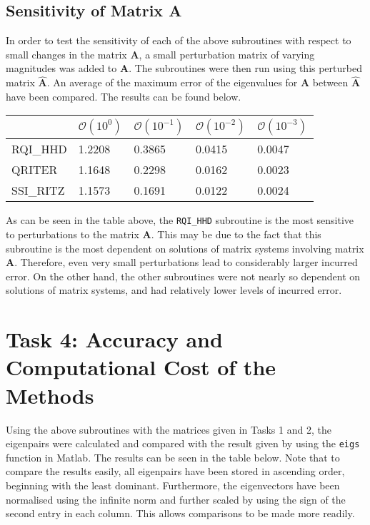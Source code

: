 \documentclass[11pt,oneside]{article}
\begin{document}
\subsection*{Sensitivity of Matrix A}

In order to test the sensitivity of each of the above subroutines with respect to small changes in the matrix \textbf{A}, a small perturbation matrix of varying magnitudes was added to \textbf{A}. The subroutines were then run using this perturbed matrix $\mathbf{\hat{A}}$. An average of the maximum error of the eigenvalues for \textbf{A} between $\mathbf{\hat{A}}$ have been compared. The results can be found below.

\begin{center}
	\begin{tabular}{| l | l | l | l | l |}
	\hline
	& $\mathcal{O}(10^0)$ & $\mathcal{O}(10^{-1})$ & $\mathcal{O}(10^{-2})$ & $\mathcal{O}(10^{-3})$	\\ \hline
	RQI\_HHD 
	& 1.2208
  	& 0.3865
  	& 0.0415
  	& 0.0047
  	\\ \hline
  	QRITER
  	& 1.1648
 	 & 0.2298
 	 & 0.0162
 	 & 0.0023
 	\\ \hline
    SSI\_RITZ
  	& 1.1573
  	& 0.1691
  	& 0.0122
  	& 0.0024
  	\\ \hline
	\end{tabular}
\end{center}

As can be seen in the table above, the \texttt{RQI\_HHD} subroutine is the most sensitive to perturbations to the matrix \textbf{A}. This may be due to the fact that this subroutine is the most dependent on solutions of matrix systems involving matrix \textbf{A}. Therefore, even very small perturbations lead to considerably larger incurred error. On the other hand, the other subroutines were not nearly so dependent on solutions of matrix systems, and had relatively lower levels of incurred error.

\section*{Task 4: Accuracy and Computational Cost of the Methods}

Using the above subroutines with the matrices given in Tasks 1 and 2, the eigenpairs were calculated and compared with the result given by using the \texttt{eigs} function in Matlab. The results can be seen in the table below. Note that to compare the results easily, all eigenpairs have been stored in ascending order, beginning with the least dominant. Furthermore, the eigenvectors have been normalised using the infinite norm and further scaled by using the sign of the second entry in each column. This allows comparisons to be made more readily.
\end{document}
